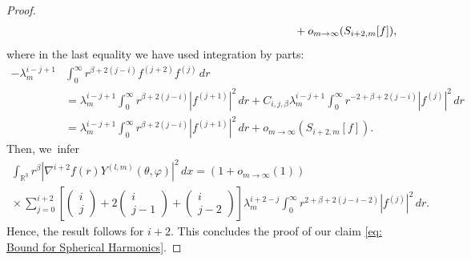 \documentclass[JEP,XML,SOM,Unicode]{cedram}
\theoremstyle{plain}
\theoremstyle{definition}
\begin{document}
\begin{proof}
\[\begin{aligned}
&\hspace*{9cm}+o_{m\to\infty}(S_{i+2,m}[f]),
\end{aligned}
\]
where in the last equality we have used integration by parts:
\[
\begin{aligned}
-\lambda_m^{i-j+1}&\int_0^\infty r^{\beta+2(j-i)}f^{(j+2)} f^{(j)}\,dr\\
&=\lambda_m^{i-j+1}\int_0^\infty r^{\beta+2(j-i)}|f^{(j+1)}|^2\,dr+C_{i,j,\beta}\lambda_m^{i-j+1}\int_0^\infty r^{-2+\beta+2(j-i)}|f^{(j)}|^2\,dr\\
&=\lambda_m^{i-j+1}\int_0^\infty r^{\beta+2(j-i)}|f^{(j+1)}|^2\,dr+o_{m\to\infty}(S_{i+2,m}[f]).
\end{aligned}
\]
Then, we~infer
\begin{multline*}
\int_{\mathbb R^3} r^\beta|\nabla^{i+2} f(r)Y^{(l,m)}(\theta,\varphi)|^2\,dx=(1+o_{m\to\infty}(1)) \\
{}\times\sum_{j=0}^{i+2} \left[\begin{pmatrix} i\\ j\end{pmatrix} +2\begin{pmatrix} i\\ j-1\end{pmatrix}+\begin{pmatrix} i\\ j-2\end{pmatrix} \right]\lambda_m^{i+2-j}\int_0^\infty r^{2+\beta+2(j-i-2)}|f^{(j)}|^2\,dr.
\end{multline*}
Hence, the result follows for $i+2$. This concludes the proof of our claim \eqref{eq: Bound for Spherical Harmonics}.


\end{proof}
\end{document}
